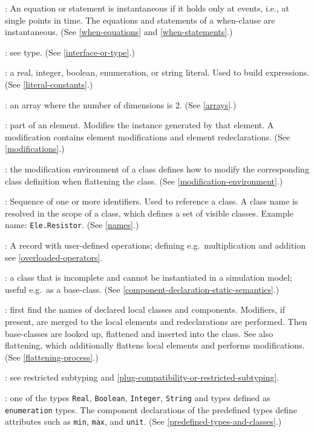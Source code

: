 : An equation or statement is instantaneous if it
holds only at events, i.e., at single points in time. The equations and
statements of a when-clause are instantaneous. (See \cref{when-equations} and
\cref{when-statements}.)

: see type. (See \cref{interface-or-type}.)

: a real, integer, boolean, enumeration, or string
literal. Used to build expressions. (See \cref{literal-constants}.)

: an array where the number of dimensions is 2. (See
\cref{arrays}.)

: part of an element. Modifies the instance
generated by that element. A modification contains element modifications
and element redeclarations. (See \cref{modifications}.)

: the modification environment of a
class defines how to modify the corresponding class definition when
flattening the class. (See \cref{modification-environment}.)

: Sequence of one or more identifiers. Used to reference a
class. A class name is resolved in the scope of a class, which defines a
set of visible classes. Example name: \lstinline!Ele.Resistor!. (See \cref{names}.)

: A record with user-defined operations;
defining e.g.\ multiplication and addition see \cref{overloaded-operators}.

: a class that is incomplete and cannot be instantiated
in a simulation model; useful e.g.\ as a base-class. (See \cref{component-declaration-static-semantics}.)

: first find the names of declared local
classes and components. Modifiers, if present, are merged to the local
elements and redeclarations are performed. Then base-classes are looked
up, flattened and inserted into the class. See also flattening, which
additionally flattens local elements and performs modifications. (See
\cref{flattening-process}.)

: see restricted subtyping and \cref{plug-compatibility-or-restricted-subtyping}.

: one of the types \lstinline!Real!, \lstinline!Boolean!, \lstinline!Integer!,
\lstinline!String! and types defined as \lstinline!enumeration! types. The component
declarations of the predefined types define attributes such as \lstinline!min!, \lstinline!max!,
and \lstinline!unit!. (See \cref{predefined-types-and-classes}.)

